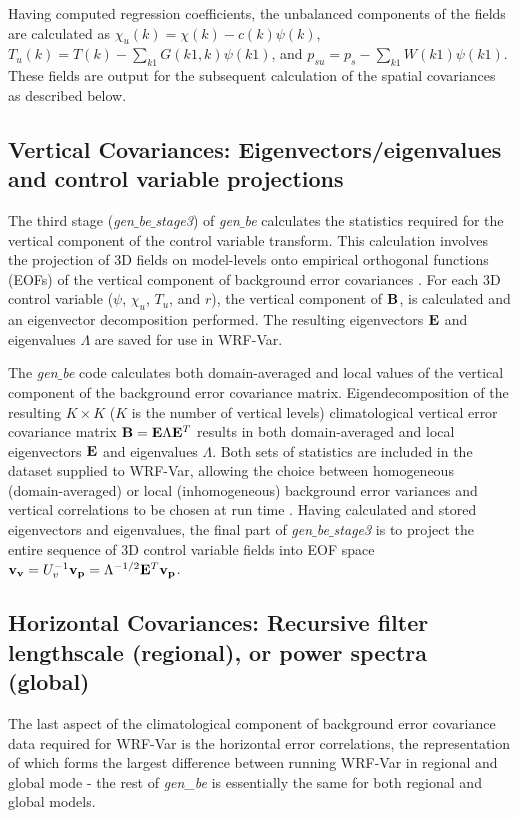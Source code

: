 Having computed regression coefficients, the unbalanced components of the fields are 
calculated as $\chi_{u}(k)=\chi(k)-c(k)\psi(k)$, $T_{u}(k)=T(k)-\sum_{k1}G(k1,k)\psi(k1)$, 
and $p_{su}=p_s - \sum_{k1} W(k1)\psi(k1)$. These fields are output for the 
subsequent calculation of the spatial covariances as described below.

\subsection{Vertical Covariances: Eigenvectors/eigenvalues and 
control variable projections} 

The third stage ({\it gen$\_$be$\_$stage3}) of {\it gen$\_$be}
calculates the statistics required for the vertical component of the
control variable transform. This calculation involves the projection
of 3D fields on model-levels onto empirical orthogonal functions
(EOFs) of the vertical component of background error covariances
\citet{barker04}. For each 3D control variable ($\psi$, $\chi_u$,
$T_u$, and $r$), the vertical component of ${\bf B}$, is calculated
and an eigenvector decomposition performed. The resulting eigenvectors
${\bf E}$ and eigenvalues $\Lambda$ are saved for use in WRF-Var.

The {\it gen$\_$be} code calculates both domain-averaged and local
values of the vertical component of the background error covariance
matrix. Eigendecomposition of the resulting $K\times K$ ($K$ is the number of 
vertical levels) climatological vertical error covariance matrix ${\bf
B}={\bf E}{\Lambda}{\bf E}^{T}$ results in both domain-averaged and
local eigenvectors $\bf E$ and eigenvalues $\Lambda$. Both sets of
statistics are included in the dataset supplied to WRF-Var, allowing
the choice between homogeneous (domain-averaged) or local
(inhomogeneous) background error variances and vertical correlations
to be chosen at run time \citet{barker04}.
Having calculated and stored eigenvectors and eigenvalues, the final
part of {\it gen$\_$be$\_$stage3} is to project the entire sequence of
3D control variable fields into EOF space ${\bf v_v}=U_{v}^{-1}{\bf
v_p}=\Lambda^{-1/2}{\bf E}^{T} {\bf v_p}$.

\subsection{Horizontal Covariances: Recursive filter lengthscale (regional), or power 
spectra (global)}

The last aspect of the climatological component of background error
covariance data required for WRF-Var is the horizontal error
correlations, the representation of which forms the largest difference
between running WRF-Var in regional and global mode - the rest of 
{\it gen\_be} is essentially the same for both regional and global models.


